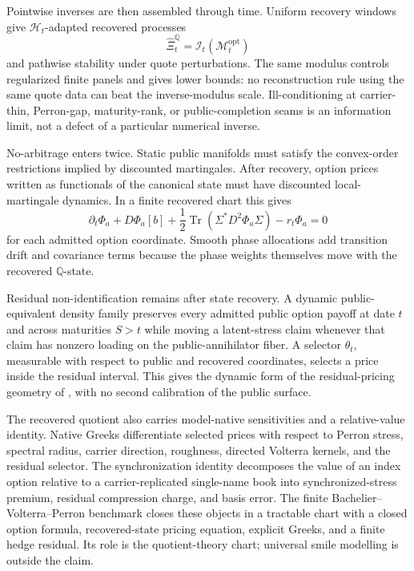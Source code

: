 \documentclass[11pt,a4paper]{amsart}
\theoremstyle{plain}
\theoremstyle{definition}
\theoremstyle{remark}
\newcommand{\QQ}{\mathbb{Q}}
\newcommand{\cH}{\mathcal{H}}
\newcommand{\cM}{\mathcal{M}}
\begin{document}
Pointwise inverses are then assembled through time.  Uniform recovery windows give \(\cH_t\)-adapted
recovered processes
\[
        \widehat\Xi_t^\QQ=\mathcal I_t(\cM_t^{\mathrm{opt}})
\]
and pathwise stability under quote perturbations.  The same modulus controls regularized finite
panels and gives lower bounds: no reconstruction rule using the same quote data can beat the
inverse-modulus scale.  Ill-conditioning at carrier-thin, Perron-gap, maturity-rank, or
public-completion seams is an information limit, not a defect of a particular numerical inverse.

No-arbitrage enters twice.  Static public manifolds must satisfy the convex-order restrictions
implied by discounted martingales.  After recovery, option prices written as functionals of the
canonical state must have discounted local-martingale dynamics.  In a finite recovered chart this
gives
\[
        \partial_t\Phi_a
        +
        D\Phi_a[b]
        +
        \frac12\operatorname{Tr}(\Sigma^\ast D^2\Phi_a\Sigma)
        -
        r_t\Phi_a
        =
        0
\]
for each admitted option coordinate.  Smooth phase allocations add transition drift and covariance
terms because the phase weights themselves move with the recovered \(\QQ\)-state.

Residual non-identification remains after state recovery.  A dynamic public-equivalent density
family preserves every admitted public option payoff at date \(t\) and across maturities \(S>t\)
while moving a latent-stress claim whenever that claim has nonzero loading on the
public-annihilator fiber.  A selector \(\theta_t\), measurable
with respect to public and recovered coordinates, selects a price inside the residual interval.
This gives the dynamic form of the residual-pricing geometry of \cite{vidal2026pricing}, with no
second calibration of the public surface.

The recovered quotient also carries model-native sensitivities and a relative-value identity.
Native Greeks differentiate selected prices with respect to Perron stress, spectral radius, carrier
direction, roughness, directed Volterra kernels, and the residual selector.  The synchronization
identity decomposes the value of an index option relative to a carrier-replicated single-name book
into synchronized-stress premium, residual compression charge, and basis error.  The finite
Bachelier--Volterra--Perron benchmark closes these objects in a tractable chart with a closed option
formula, recovered-state pricing equation, explicit Greeks, and a finite hedge residual.  Its role is
the quotient-theory chart; universal smile modelling is outside the claim.
\end{document}
